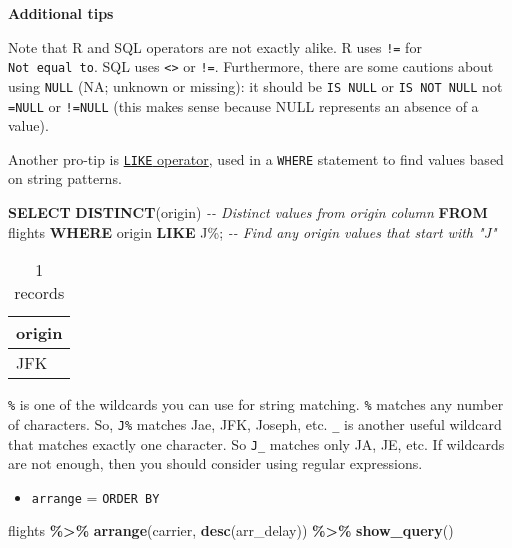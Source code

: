 \documentclass[
]{book}
\newenvironment{Shaded}{\begin{snugshade}}{\end{snugshade}}
\newcommand{\CommentTok}[1]{\textcolor[rgb]{0.56,0.35,0.01}{\textit{#1}}}
\newcommand{\KeywordTok}[1]{\textcolor[rgb]{0.13,0.29,0.53}{\textbf{#1}}}
\newcommand{\NormalTok}[1]{#1}
\newcommand{\OperatorTok}[1]{\textcolor[rgb]{0.81,0.36,0.00}{\textbf{#1}}}
\newcommand{\StringTok}[1]{\textcolor[rgb]{0.31,0.60,0.02}{#1}}
\providecommand{\tightlist}{%
  \setlength{\itemsep}{0pt}\setlength{\parskip}{0pt}}
\begin{document}
\textbf{Additional tips}

Note that R and SQL operators are not exactly alike. R uses \texttt{!=} for \texttt{Not\ equal\ to}. SQL uses \texttt{\textless{}\textgreater{}} or \texttt{!=}. Furthermore, there are some cautions about using \texttt{NULL} (NA; unknown or missing): it should be \texttt{IS\ NULL} or \texttt{IS\ NOT\ NULL} not \texttt{=NULL} or \texttt{!=NULL} (this makes sense because NULL represents an absence of a value).

Another pro-tip is \href{https://www.w3schools.com/sql/sql_like.asp}{\texttt{LIKE} operator}, used in a \texttt{WHERE} statement to find values based on string patterns.

\begin{Shaded}
\begin{Highlighting}[]
\KeywordTok{SELECT} \KeywordTok{DISTINCT}\NormalTok{(origin) }\CommentTok{{-}{-} Distinct values from origin column}
\KeywordTok{FROM}\NormalTok{ flights}
\KeywordTok{WHERE}\NormalTok{ origin }\KeywordTok{LIKE} \StringTok{\textquotesingle{}J\%\textquotesingle{}}\NormalTok{; }\CommentTok{{-}{-} Find any origin values that start with "J"}
\end{Highlighting}
\end{Shaded}

\begin{table}

\caption{\label{tab:unnamed-chunk-16}1 records}
\centering
\begin{tabular}[t]{l}
\hline
origin\\
\hline
JFK\\
\hline
\end{tabular}
\end{table}

\texttt{\%} is one of the wildcards you can use for string matching. \texttt{\%} matches any number of characters. So, \texttt{J\%} matches Jae, JFK, Joseph, etc. \texttt{\_} is another useful wildcard that matches exactly one character. So \texttt{J\_} matches only JA, JE, etc. If wildcards are not enough, then you should consider using regular expressions.

\begin{itemize}
\tightlist
\item
  \texttt{arrange} = \texttt{ORDER\ BY}
\end{itemize}

\begin{Shaded}
\begin{Highlighting}[]
\NormalTok{flights }\OperatorTok{\%\textgreater{}\%}\StringTok{ }
\StringTok{  }\KeywordTok{arrange}\NormalTok{(carrier, }\KeywordTok{desc}\NormalTok{(arr\_delay)) }\OperatorTok{\%\textgreater{}\%}
\StringTok{  }\KeywordTok{show\_query}\NormalTok{()}
\end{Highlighting}
\end{Shaded}
\end{document}
